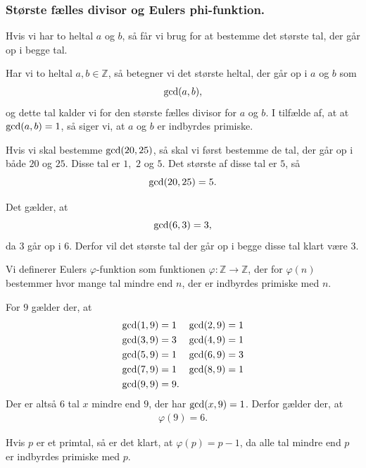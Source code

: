\documentclass[12pt]{article}
\begin{document}
\subsubsection*{Største fælles divisor og Eulers phi-funktion.}
Hvis vi har to heltal $a$ og $b$, så får vi brug for at bestemme det største tal, der går op i begge tal.
\begin{defn}
Har vi to heltal $a,b\in \mathbb{Z}$, så betegner vi det største heltal, der går op i $a$ og $b$ som
\begin{align*}
\textnormal{gcd}(a,b),
\end{align*}
og dette tal kalder vi for den største fælles divisor for $a$ og $b$. I tilfælde af, at at $\textnormal{gcd}(a,b) = 1$, så siger vi, at $a$ og $b$ er indbyrdes primiske. 
\end{defn}
\begin{exa}
Hvis vi skal bestemme $\textnormal{gcd}(20,25)$, så skal vi først bestemme de tal, der går op i både $20$ og $25$. Disse tal er $1,$ $2$ og $5$. Det største af disse tal er $5$, så 
\[
\textnormal{gcd}(20,25) = 5.
\]
\end{exa}
\begin{exa}
Det gælder, at 
\[
\textnormal{gcd}(6,3) = 3,
\]
da $3$ går op i $6$. Derfor vil det største tal der går op i begge disse tal klart være $3$. 
\end{exa}
\begin{defn}
Vi definerer Eulers $\varphi$-funktion som funktionen $\varphi: \mathbb{Z} \to \mathbb{Z}$, der for $\varphi(n)$ bestemmer hvor mange tal mindre end $n$, der er indbyrdes primiske med $n$. 
\end{defn}
\begin{exa}
For $9$ gælder der, at 
\begin{align*}
&\textnormal{gcd}(1,9) = 1
&&\textnormal{gcd}(2,9) = 1\\
&\textnormal{gcd}(3,9) = 3
&&\textnormal{gcd}(4,9) = 1\\
&\textnormal{gcd}(5,9) = 1
&&\textnormal{gcd}(6,9) = 3\\
&\textnormal{gcd}(7,9) = 1
&&\textnormal{gcd}(8,9) = 1\\
&\textnormal{gcd}(9,9) = 9.
\end{align*}
Der er altså 6 tal $x$ mindre end $9$, der har $\textnormal{gcd}(x,9)=1$. Derfor gælder der, at 
\begin{align*}
\varphi(9) = 6. 
\end{align*}
\end{exa}
\begin{exa}
Hvis $p$ er et primtal, så er det klart, at $\varphi(p) = p-1$, da alle tal mindre end $p$ er indbyrdes primiske med $p$.
\end{exa}
\end{document}
